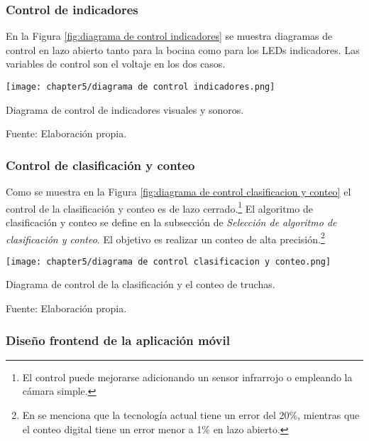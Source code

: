 \subsubsection{Control de indicadores}

En la Figura \ref{fig:diagrama de control indicadores} se muestra diagramas de control en lazo abierto tanto para la bocina como para los LEDs indicadores. Las variables de control son el voltaje en los dos casos.

\begin{myfigure}[H]
	\footnotesize\centering
	\texttt{[image: chapter5/diagrama de control indicadores.png]}
	\caption{Diagrama de control de indicadores visuales y sonoros.}
	\begin{myflushcenter}
		Fuente: Elaboración propia.
	\end{myflushcenter}
	\label{fig:diagrama de control indicadores}
\end{myfigure}

\subsubsection{Control de clasificación y conteo}

Como se muestra en la Figura \ref{fig:diagrama de control clasificacion y conteo} el control de la clasificación y conteo es de lazo cerrado.\footnote{El control puede mejorarse adicionando un sensor infrarrojo o empleando la cámara simple.} El algoritmo de clasificación y conteo se define en la subsección de \textit{Selección de algoritmo de clasificación y conteo}. El objetivo es realizar un conteo de alta precisión.\footnote{En \cite{Borisovich2016} se menciona que la tecnología actual tiene un error del 20\%, mientras que el conteo digital tiene un error menor a 1\% en lazo abierto.}

\begin{myfigure}[H]
	\footnotesize\centering
	\texttt{[image: chapter5/diagrama de control clasificacion y conteo.png]}
	\caption{Diagrama de control de la clasificación y el conteo de truchas.}
	\begin{myflushcenter}
		Fuente: Elaboración propia.
	\end{myflushcenter}
	\label{fig:diagrama de control clasificacion y conteo}
\end{myfigure}

\subsubsection{Diseño frontend de la aplicación móvil}


